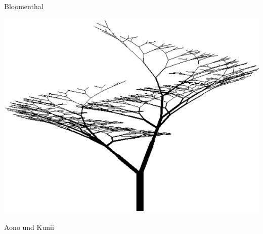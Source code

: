 \begin{center}
\begin{minipage}[c]{0.45\textwidth}
		Bloomenthal \cite{ABOP:04}
	\end{minipage}
	\hspace{.05\textwidth}	
	\begin{minipage}[c]{0.45\textwidth}
		\centering
		\includegraphics[height=0.6\textheight]{images/CH1_AonoKunii1.png}
		
		Aono und Kunii \cite{ABOP:04}
	\end{minipage}
\end{center}
\fi


	
